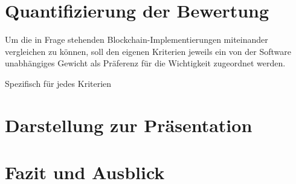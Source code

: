 \chapter{Quantifizierung der Bewertung}

Um die in Frage stehenden Blockchain-Implementierungen miteinander vergleichen zu können,
soll den eigenen Kriterien jeweils ein von der Software unabhängiges Gewicht als Präferenz für die Wichtigkeit zugeordnet werden.

Spezifisch für jedes Kriterien 
  
\chapter{Darstellung zur Präsentation}



\chapter{Fazit und Ausblick}







